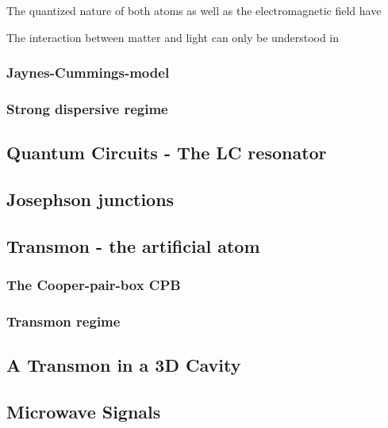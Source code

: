 The quantized nature of both atoms as well as the electromagnetic field have   

The interaction between matter and light can only be understood in 




\subsubsection{Jaynes-Cummings-model}
\subsubsection{Strong dispersive regime}

\subsection{Quantum Circuits - The LC resonator}
\label{subsec:introduction:the_LC_resonator}


\subsection{Josephson junctions}
\label{subsec:introduction:josephson_junctions}

\subsection{Transmon - the artificial atom}
\label{subsec:introduction:transmon}

\subsubsection{The Cooper-pair-box CPB}
\subsubsection{Transmon regime}


\subsection{A Transmon in a 3D Cavity}
\label{subsec:introduction:transmon_in_a_3D_cavity}



\subsection{Microwave Signals}
\label{subsec:introduction:microwave_signals}

